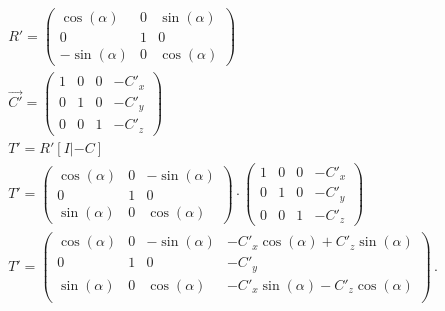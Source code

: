 

\begin{gather}			
	R'= 
	\begin{pmatrix}
		\cos(\alpha)&0&\sin(\alpha)\\
		0&1&0\\
		-\sin(\alpha)&0&\cos(\alpha)
	\end{pmatrix}\\
	\vec{C'}= 
	\begin{pmatrix}
		1&0&0&-C'_x\\
		0&1&0&-C'_y\\
		0&0&1&-C'_z			
	\end{pmatrix}\\
	T'=R'[I|-C]\\
	T'=		\begin{pmatrix}
		\cos(\alpha)&0&-\sin(\alpha)\\
		0&1&0\\
		\sin(\alpha)&0&\cos(\alpha)
	\end{pmatrix} 
	\cdot
	\begin{pmatrix}
		1&0&0&-C'_x\\
		0&1&0&-C'_y\\
		0&0&1&-C'_z			
	\end{pmatrix}\\
	T'=
	\begin{pmatrix}
		\cos(\alpha)&0&-\sin(\alpha)&-C'_x\cos(\alpha)+C'_z\sin(\alpha)\\
		0&1&0&-C'_y\\
		\sin(\alpha)&0&\cos(\alpha)&-C'_x\sin(\alpha)-C'_z\cos(\alpha)\\
	\end{pmatrix}\, .
\end{gather}\\





